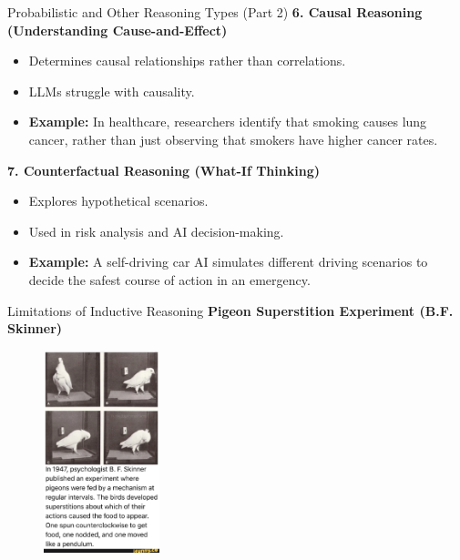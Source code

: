 \documentclass{beamer}
\begin{document}
\begin{frame}{Probabilistic and Other Reasoning Types (Part 2)}
    \textbf{6. Causal Reasoning (Understanding Cause-and-Effect)}
    \begin{itemize}
        \item Determines causal relationships rather than correlations.
        \item LLMs struggle with causality.
        \item \textbf{Example:} In healthcare, researchers identify that smoking causes lung cancer, rather than just observing that smokers have higher cancer rates.
    \end{itemize}

    \textbf{7. Counterfactual Reasoning (What-If Thinking)}
    \begin{itemize}
        \item Explores hypothetical scenarios.
        \item Used in risk analysis and AI decision-making.
        \item \textbf{Example:} A self-driving car AI simulates different driving scenarios to decide the safest course of action in an emergency.
    \end{itemize}
\end{frame}


\begin{frame}{Limitations of Inductive Reasoning}
    \textbf{Pigeon Superstition Experiment (B.F. Skinner)}
    \begin{figure}
        \centering
        \includegraphics[width=0.3\textwidth]{figures/superstition.png}
    \end{figure}
\end{frame}
\end{document}
